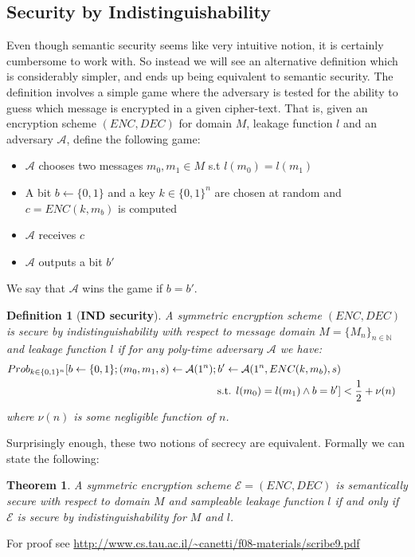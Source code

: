 \documentclass[12pt]{article}
\newcommand{\adv}{\mathcal{A}}
\newcommand{\pr}{Prob}
\newtheorem{definition}{Definition}[section]
\newtheorem{theorem}{Theorem}[section]
\begin{document}
\subsection{Security by Indistinguishability}
Even though semantic security seems like very intuitive notion, it is certainly cumbersome to work with. So instead we will see an alternative definition which is considerably simpler, and ends up being equivalent to semantic security. The definition involves a simple game where the adversary is tested for the ability to guess which message is encrypted in a given cipher-text. That is, given an encryption scheme $(ENC,DEC)$ for domain $M$, leakage function $l$ and an adversary $\adv$, define the following game:
\begin{itemize}
\item $\adv$ chooses two messages $m_0,m_1 \in M$ s.t $l(m_0) = l(m_1)$ 
\item A bit $b \leftarrow \{0, 1\}$ and a key $k \in \{0, 1\}^n$ are chosen at random and $c = ENC(k,m_b)$ is computed 
\item $\adv$ receives $c$
\item $\adv$ outputs a bit $b'$
\end{itemize}
We say that $\adv$ wins the game if $b = b'$.
\begin{definition}[\textbf{IND security}]
A symmetric encryption scheme $(ENC,DEC)$ is secure by indistinguishability with respect to message domain $M = \{M_n\}_{n\in\mathbb{N}}$ and leakage function $l$ if for any poly-time adversary $\adv$ we have:
\begin{align*} \pr_{k \in \{0,1\}^n}[b\leftarrow \{0,1\}; (m_0,m_1,s) \leftarrow \adv(1^n); b' \leftarrow \adv(1^n,ENC(k,m_b),s)\\ \text{s.t. } l(m_0) = l(m_1) \wedge b = b'] &< {1 \over 2} + \nu (n)
\end{align*}
where $\nu(n)$ is some negligible function of $n$.
\end{definition}
Surprisingly enough, these two notions of secrecy are equivalent. Formally we can state the following:
\begin{theorem}
A symmetric encryption scheme $\mathcal{E} = (ENC,DEC)$ is semantically secure with respect to domain $M$ and sampleable leakage function $l$ if and only if $\mathcal{E}$ is secure by indistinguishability for $M$ and $l$.
\end{theorem}
For proof see \url{http://www.cs.tau.ac.il/~canetti/f08-materials/scribe9.pdf}
\end{document}
